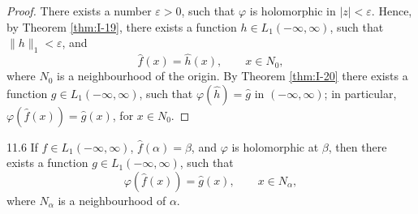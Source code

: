 \begin{proof}
There exists a number $\varepsilon>0$, such that $\varphi$ is holomorphic in $|z|<\varepsilon$. Hence, by Theorem \ref{thm:I-19}, there exists a function $h\in L_1(-\infty,\infty)$, such that $\|h\|_1<\varepsilon$, and
\begin{equation*}
\widehat f(x)=\widehat h(x),\qquad x\in N_0,
\end{equation*}
where $N_0$ is a neighbourhood of the origin. By Theorem \ref{thm:I-20} there exists a function $g\in L_1(-\infty,\infty)$, such that $\varphi(\widehat h)=\widehat g$ in $(-\infty,\infty)$; in particular, $\varphi(\widehat f(x))=\widehat g(x)$, for $x\in N_0$.
\end{proof}

\begin{nstmt}{11.6}\label{eq:I-11.6}
If $f\in L_1(-\infty,\infty)$, $\widehat f(\alpha)=\beta$, and $\varphi$ is holomorphic at $\beta$, then there exists a function $g\in L_1(-\infty,\infty)$, such that
\[
\varphi(\widehat f(x))=\widehat g(x),\qquad x\in N_\alpha,
\]
where $N_\alpha$ is a neighbourhood of $\alpha$.
\end{nstmt}

